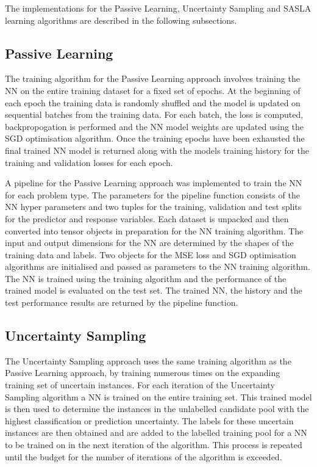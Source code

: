 \documentclass[conference]{IEEEtran}
\begin{document}
	The implementations for the Passive Learning, Uncertainty Sampling and SASLA learning algorithms are described in the following subsections.
	
	\subsection{Passive Learning}
	The training algorithm for the Passive Learning approach involves training the NN on the entire training dataset for a fixed set of epochs. At the beginning of each epoch the training data is randomly shuffled and the model is updated on sequential batches from the training data. For each batch, the loss is computed, backpropogation is performed and the NN model weights are updated using the SGD optimisation algorithm. Once the training epochs have been exhausted the final trained NN model is returned along with the models training history for the training and validation losses for each epoch.
	
	A pipeline for the Passive Learning approach was implemented to train the NN for each problem type. The parameters for the pipeline function consists of the NN hyper parameters and two tuples for the training, validation and test splits for the predictor and response variables. Each dataset is unpacked and then converted into tensor objects in preparation for the NN training algorithm. The input and output dimensions for the NN are determined by the shapes of the training data and labels. Two objects for the MSE loss and SGD optimisation algorithms are initialised and passed as parameters to the NN training algorithm. The NN is trained using the training algorithm and the performance of the trained model is evaluated on the test set. The trained NN, the history and the test performance results are returned by the pipeline function.
	
	\subsection{Uncertainty Sampling}
	The Uncertainty Sampling approach uses the same training algorithm as the Passive Learning approach, by training numerous times on the expanding training set of uncertain instances. For each iteration of the Uncertainty Sampling algorithm a NN is trained on the entire training set. This trained model is then used to determine the instances in the unlabelled candidate pool with the highest classification or prediction uncertainty. The labels for these uncertain instances are then obtained and are added to the labelled training pool for a NN to be trained on in the next iteration of the algorithm. This process is repeated until the budget for the number of iterations of the algorithm is exceeded. 
	
\end{document}
